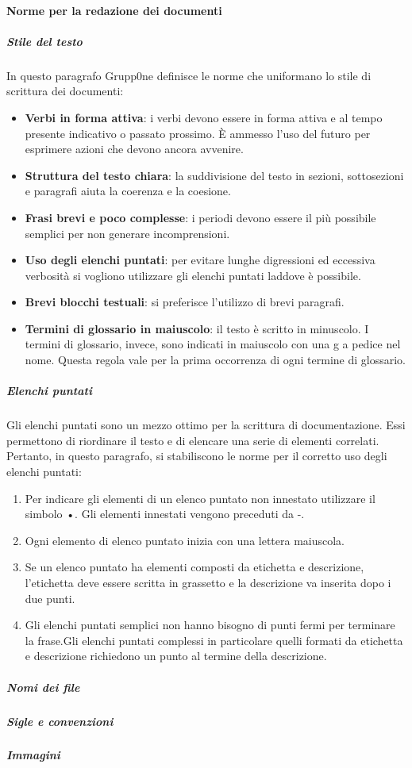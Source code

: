 \documentclass[../norme-di-progetto.tex]{subfiles}
\begin{document}
\paragraph{Norme per la redazione dei documenti}
\label{par:norme per la redazione dei documenti}
\subparagraph{Stile del testo}
\label{subp:stile del testo}
In questo paragrafo Grupp0ne definisce le norme che uniformano lo stile di scrittura dei documenti:
\begin{itemize}
		\item \textbf{Verbi in forma attiva}: i verbi devono essere in forma attiva e al tempo presente indicativo o passato prossimo. È ammesso l'uso del futuro per esprimere azioni che devono ancora avvenire.
		\item \textbf{Struttura del testo chiara}: la suddivisione del testo in sezioni, sottosezioni e paragrafi aiuta la coerenza e la coesione.
		\item \textbf{Frasi brevi e poco complesse}: i periodi devono essere il più possibile semplici per non generare incomprensioni.
		\item \textbf{Uso degli elenchi puntati}: per evitare lunghe digressioni ed eccessiva verbosità si vogliono utilizzare gli elenchi puntati laddove è possibile.
		\item \textbf{Brevi blocchi testuali}: si preferisce l'utilizzo di brevi paragrafi.
		\item \textbf{Termini di glossario in maiuscolo}: il testo è scritto in minuscolo. I termini di glossario, invece, sono indicati in maiuscolo con una g a pedice nel nome. Questa regola vale per la prima occorrenza di ogni termine di glossario.
\end{itemize}
\subparagraph{Elenchi puntati}
\label{subp:elenchi puntati}
Gli elenchi puntati sono un mezzo ottimo per la scrittura di documentazione. Essi permettono di riordinare il testo e di elencare una serie di elementi correlati. Pertanto, in questo paragrafo, si stabiliscono le norme per il corretto uso degli elenchi puntati:
\begin{enumerate}
	\item Per indicare gli elementi di un elenco puntato non innestato utilizzare il simbolo •. Gli elementi innestati vengono preceduti da -.
	\item Ogni elemento di elenco puntato inizia con una lettera maiuscola.
	\item Se un elenco puntato ha elementi composti da etichetta e descrizione, l'etichetta deve essere scritta in grassetto e la descrizione va inserita dopo i due punti.
	\item Gli elenchi puntati semplici non hanno bisogno di punti fermi per terminare la frase.Gli elenchi puntati complessi in particolare quelli formati da etichetta e descrizione richiedono un punto al termine della descrizione.
\end{enumerate}
\subparagraph{Nomi dei file}
\label{nomi dei file}
\subparagraph{Sigle e convenzioni}
\label{sigle e convenzioni}
\subparagraph{Immagini}
\end{document}
